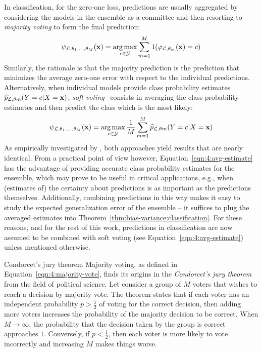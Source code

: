 In classification, for the zero-one loss, predictions are usually aggregated by considering the
models in the ensemble as a committee  and then resorting to \textit{majority voting} to
form the final prediction:
\begin{equation}\label{eqn:4:majority-vote}
\psi_{{\cal L},\theta_1,\dots,\theta_M}(\mathbf{x}) = \operatorname*{arg\,max}_{c \in {\cal Y}}  \sum_{m=1}^M 1(\varphi_{{\cal L},\theta_m}(\mathbf{x})=c)
\end{equation}
Similarly, the rationale is that the majority prediction is the prediction that minimizes
the average zero-one error with respect to the individual predictions.
Alternatively, when individual models provide class probability estimates $\widehat{p}_{{\cal L},\theta m}(Y=c|X=\mathbf{x})$,
\textit{soft voting}~\citep{zhou:2012}
consists in averaging the class probability estimates
and then predict the class which is the most likely:
\begin{equation}\label{eqn:4:avg-estimate}
\psi_{{\cal L},\theta_1,\dots,\theta_M}(\mathbf{x}) = \operatorname*{arg\,max}_{c \in {\cal Y}} \frac{1}{M} \sum_{m=1}^M \widehat{p}_{{\cal L},\theta m}(Y=c|X=\mathbf{x})
\end{equation}
As empirically investigated by \citet{breiman:1996b}, both approaches yield
results that are nearly identical. From a practical point of view however,
Equation~\ref{eqn:4:avg-estimate} has the advantage of providing accurate class
probability estimates for the ensemble, which may prove to be useful in
critical applications, e.g., when (estimates of) the certainty about
predictions is as important as the predictions themselves. Additionally,
combining predictions in this way makes it easy to study the expected
generalization error of the ensemble -- it suffices to plug the averaged
estimates into Theorem~\ref{thm:bias-variance:classification}. For these
reasons, and for the rest of this work, predictions in classification are now
assumed to be combined with soft voting (see Equation~\ref{eqn:4:avg-estimate}) unless
mentioned otherwise.

\begin{remark}{Condorcet's jury theorem}
Majority voting, as defined in Equation~\ref{eqn:4:majority-vote},
finds its origins in the \textit{Condorcet's jury theorem}
from the field of political science. Let consider a group of $M$ voters that
wishes to reach a decision by majority vote. The theorem states that if each
voter has an independent  probability $p > \tfrac{1}{2}$ of voting for the
correct decision, then adding more voters increases the probability of
the majority decision to be correct. When $M \to \infty$, the probability that the decision
taken by the group is correct approaches $1$. Conversely, if $p < \tfrac{1}{2}$, then
each voter is more likely to vote incorrectly and increasing $M$ makes things
worse.
\end{remark}

